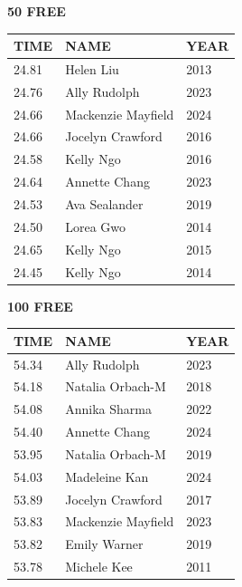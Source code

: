 \clearpage
\begin{table}[H]
\centering
\begin{minipage}[t]{0.48\textwidth}
\centering
\textbf{50 FREE}\\[0.1cm]
\begin{tabular}{@{}p{1.8cm}p{2.8cm}p{1.2cm}@{}}
\hline
    \textbf{TIME} & \textbf{NAME} & \textbf{YEAR} \\
\hline
    24.81 & Helen Liu & 2013 \\
    24.76 & Ally Rudolph & 2023 \\
    24.66 & Mackenzie Mayfield & 2024 \\
    24.66 & Jocelyn Crawford & 2016 \\
    24.58 & Kelly Ngo & 2016 \\
    24.64 & Annette Chang & 2023 \\
    24.53 & Ava Sealander & 2019 \\
    24.50 & Lorea Gwo & 2014 \\
    24.65 & Kelly Ngo & 2015 \\
    24.45 & Kelly Ngo & 2014 \\
\hline
\end{tabular}
\end{minipage}\hfill
\begin{minipage}[t]{0.48\textwidth}
\centering
\textbf{100 FREE}\\[0.1cm]
\begin{tabular}{@{}p{1.8cm}p{2.8cm}p{1.2cm}@{}}
\hline
    \textbf{TIME} & \textbf{NAME} & \textbf{YEAR} \\
\hline
    54.34 & Ally Rudolph & 2023 \\
    54.18 & Natalia Orbach-M & 2018 \\
    54.08 & Annika Sharma & 2022 \\
    54.40 & Annette Chang & 2024 \\
    53.95 & Natalia Orbach-M & 2019 \\
    54.03 & Madeleine Kan & 2024 \\
    53.89 & Jocelyn Crawford & 2017 \\
    53.83 & Mackenzie Mayfield & 2023 \\
    53.82 & Emily Warner & 2019 \\
    53.78 & Michele Kee & 2011 \\
\hline
\end{tabular}
\end{minipage}
\end{table}

